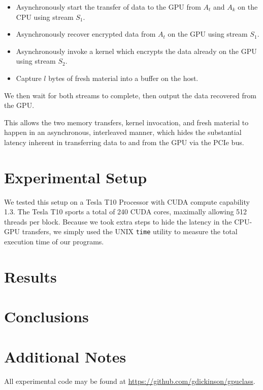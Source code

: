 \documentclass[twocolumn]{article}
\begin{document}
  \begin{itemize}
    \item Asynchronously start the transfer of data to the GPU from $A_t$ and $A_k$ on the CPU using stream $S_1$.
    \item Asynchronously recover encrypted data from $A_t$ on the GPU using stream $S_1$.
    \item Asynchronously invoke a kernel which encrypts the data already on the GPU using stream $S_2$.
    \item Capture $l$ bytes of fresh material into a buffer on the host.
  \end{itemize}
  
  We then wait for both streams to complete, then output the data recovered from the GPU.
  
  This allows the two memory transfers, kernel invocation, and fresh material to happen in an asynchronous, interleaved manner, which hides the substantial latency inherent in transferring data to and from the GPU via the PCIe bus.

  
  \section{Experimental Setup}
  
  We tested this setup on a Tesla T10 Processor with CUDA compute capability 1.3. The Tesla T10 sports a total of 240 CUDA cores, maximally allowing 512 threads per block. Because we took extra steps to hide the latency in the CPU-GPU transfers, we simply used the UNIX \texttt{time} utility to measure the total execution time of our programs.
  
  \section{Results}
  
  \section{Conclusions}
  
  \section{Additional Notes}
  All experimental code may be found at \url{https://github.com/gdickinson/gpuclass}.
  
  {}
  
  
  

  
\end{document}
